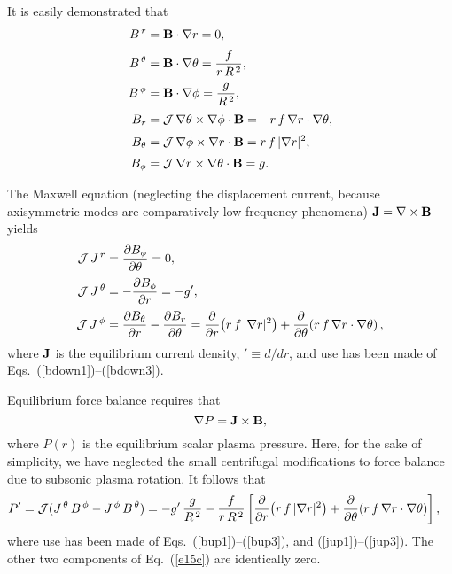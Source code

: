 \documentclass[12pt,prb,aps,notitlepage]{revtex4-1}
\begin{document}
It is easily demonstrated that
\begin{align}
B^{\,r}&={\bf B}\cdot\nabla r= 0,\label{bup1}\\[0.5ex]
B^{\,\theta} &={\bf B}\cdot\nabla \theta= \frac{f}{r\,R^{\,2}},\label{bup2}\\[0.5ex]
B^{\,\phi} &={\bf B}\cdot\nabla \phi= \frac{g}{R^{\,2}},\label{bup3}\\[0.5ex]
B_r &={\cal J}\,\nabla\theta\times\nabla\phi\cdot{\bf B}= -r\,f\,\nabla r\cdot\nabla\theta,\label{bdown1}\\[0.5ex]
B_\theta &={\cal J}\,\nabla\phi\times\nabla r\cdot{\bf B}= r\,f\,|\nabla r|^2,\\[0.5ex]
B_\phi &={\cal J}\,\nabla r\times\nabla \theta \cdot{\bf B}= g.\label{bdown3}
\end{align}

The Maxwell equation (neglecting the displacement current, because axisymmetric modes are comparatively low-frequency phenomena)
${\bf J}= \nabla\times{\bf B}$
yields
\begin{align}
{\cal J}\,J^{\,r} &= \frac{\partial B_\phi}{\partial \theta} =0,\label{jup1}\\[0.5ex]
{\cal J}\,J^{\,\theta} &= -\frac{\partial B_\phi}{\partial r} = - g',\label{jup2}\\[0.5ex]
{\cal J}\,J^{\,\phi}&= \frac{\partial B_\theta}{\partial r} -\frac{\partial B_r}{\partial\theta}=\frac{\partial}{\partial r}\!\left(r\,f\,|\nabla r|^2\right)+ \frac{\partial}{\partial\theta}\!\left(r\,f\,\nabla r\cdot\nabla\theta\right),\label{jup3}
\end{align}
where ${\bf J}$ is the equilibrium current density, $'\equiv d/dr$, and use has been made of  Eqs.~(\ref{bdown1})--(\ref{bdown3}).

Equilibrium force balance requires that
\begin{equation}\label{e15c}
 \nabla P={\bf J}\times {\bf B},
\end{equation}
where $P(r)$ is the equilibrium scalar plasma pressure. Here, for the sake of simplicity, we have neglected the small centrifugal modifications to force balance due to subsonic plasma
rotation.
It follows that 
\begin{align}\label{eg1}
P'&= {\cal J}(J^{\,\theta}\,B^{\,\phi}-J^{\,\phi}\,B^{\,\theta})= -g'\,\frac{g}{R^{\,2}} - \frac{f}{r\,R^{\,2}}\left[\frac{\partial}{\partial r}\!\left(r\,f\,|\nabla r|^2\right)+ \frac{\partial}{\partial\theta}\!\left(r\,f\,\nabla r\cdot\nabla\theta\right)\right],
\end{align}
where use has been made of Eqs.~(\ref{bup1})--(\ref{bup3}), and  (\ref{jup1})--(\ref{jup3}). The
other two components of Eq.~(\ref{e15c}) are identically zero. 
\end{document}

